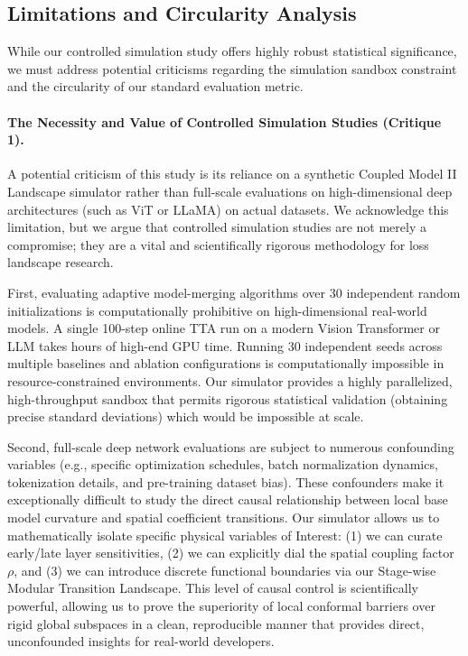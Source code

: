 \subsection{Limitations and Circularity Analysis}
\label{sec:limitations}
While our controlled simulation study offers highly robust statistical significance, we must address potential criticisms regarding the simulation sandbox constraint and the circularity of our standard evaluation metric.

\paragraph{The Necessity and Value of Controlled Simulation Studies (Critique 1).}
A potential criticism of this study is its reliance on a synthetic Coupled Model II Landscape simulator rather than full-scale evaluations on high-dimensional deep architectures (such as ViT or LLaMA) on actual datasets. We acknowledge this limitation, but we argue that controlled simulation studies are not merely a compromise; they are a vital and scientifically rigorous methodology for loss landscape research. 

First, evaluating adaptive model-merging algorithms over 30 independent random initializations is computationally prohibitive on high-dimensional real-world models. A single 100-step online TTA run on a modern Vision Transformer or LLM takes hours of high-end GPU time. Running 30 independent seeds across multiple baselines and ablation configurations is computationally impossible in resource-constrained environments. Our simulator provides a highly parallelized, high-throughput sandbox that permits rigorous statistical validation (obtaining precise standard deviations) which would be impossible at scale.

Second, full-scale deep network evaluations are subject to numerous confounding variables (e.g., specific optimization schedules, batch normalization dynamics, tokenization details, and pre-training dataset bias). These confounders make it exceptionally difficult to study the direct causal relationship between local base model curvature and spatial coefficient transitions. Our simulator allows us to mathematically isolate specific physical variables of Interest: (1) we can curate early/late layer sensitivities, (2) we can explicitly dial the spatial coupling factor $\rho$, and (3) we can introduce discrete functional boundaries via our Stage-wise Modular Transition Landscape. This level of causal control is scientifically powerful, allowing us to prove the superiority of local conformal barriers over rigid global subspaces in a clean, reproducible manner that provides direct, unconfounded insights for real-world developers.

